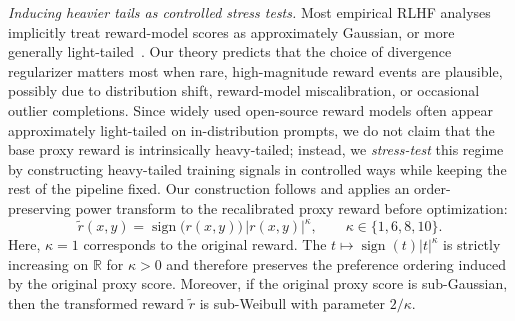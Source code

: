 \documentclass[11pt]{article}
\renewcommand{\paragraph}[1]{\noindent\textit{#1}}
\begin{document}
\paragraph{Inducing heavier tails as controlled stress tests.}
Most empirical RLHF analyses implicitly treat reward-model scores as approximately Gaussian, or more generally light-tailed~\citep{yan2024reward,yang2024bayesian}.
Our theory predicts that the choice of divergence regularizer matters most when rare, high-magnitude reward events are plausible, possibly due to distribution shift, reward-model miscalibration, or occasional outlier completions. Since widely used open-source reward models often appear approximately light-tailed on in-distribution prompts, we do not claim that the base proxy reward is intrinsically heavy-tailed; instead, we \emph{stress-test} this regime by constructing heavy-tailed training signals in controlled ways while keeping the rest of the pipeline fixed. Our construction follows \cite{bakhshizadeh2023sharp} and applies an order-preserving power transform to the recalibrated proxy reward before optimization:
\[
\tilde r(x,y)=\operatorname{sign}\!\big(r(x,y)\big)\,\big|r(x,y)\big|^{\kappa},
\qquad \kappa \in \{1,6,8,10\}.
\]
Here, $\kappa=1$ corresponds to the original reward. The $t\mapsto \operatorname{sign}(t)|t|^{\kappa}$ is strictly increasing on $\mathbb{R}$ for $\kappa>0$ and therefore preserves the preference ordering induced by the original proxy score. Moreover, if the original proxy score is sub-Gaussian, then the transformed reward $\tilde r$ is sub-Weibull with parameter \(2/\kappa\).  


\end{document}
